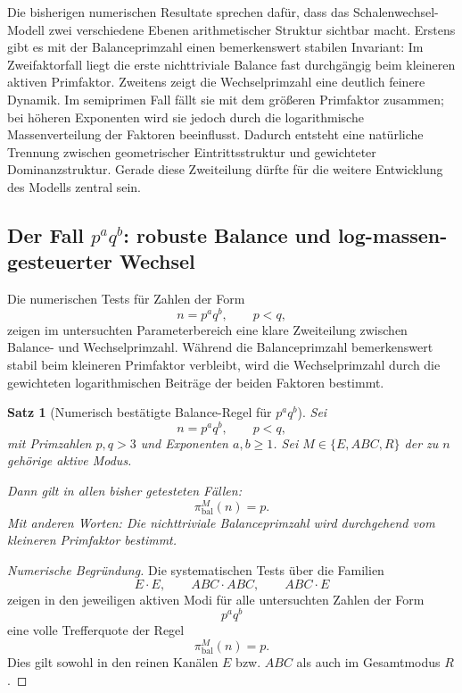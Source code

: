 \documentclass[11pt,a4paper]{article}
\newtheorem{satz}{Satz}
\theoremstyle{definition}
\theoremstyle{remark}
\begin{document}
	Die bisherigen numerischen Resultate sprechen dafür, dass das Schalenwechsel-Modell
	zwei verschiedene Ebenen arithmetischer Struktur sichtbar macht. Erstens gibt es
	mit der Balanceprimzahl einen bemerkenswert stabilen Invariant: Im Zweifaktorfall
	liegt die erste nichttriviale Balance fast durchgängig beim kleineren aktiven
	Primfaktor. Zweitens zeigt die Wechselprimzahl eine deutlich feinere Dynamik.
	Im semiprimen Fall fällt sie mit dem größeren Primfaktor zusammen; bei höheren
	Exponenten wird sie jedoch durch die logarithmische Massenverteilung der Faktoren
	beeinflusst. Dadurch entsteht eine natürliche Trennung zwischen geometrischer
	Eintrittsstruktur und gewichteter Dominanzstruktur. Gerade diese Zweiteilung
	dürfte für die weitere Entwicklung des Modells zentral sein.
	
	\subsection{Der Fall \(p^a q^b\): robuste Balance und log-massen-gesteuerter Wechsel}
	
	Die numerischen Tests für Zahlen der Form
	\[
	n=p^a q^b,\qquad p<q,
	\]
	zeigen im untersuchten Parameterbereich eine klare Zweiteilung zwischen Balance- und
	Wechselprimzahl. Während die Balanceprimzahl bemerkenswert stabil beim kleineren
	Primfaktor verbleibt, wird die Wechselprimzahl durch die gewichteten logarithmischen
	Beiträge der beiden Faktoren bestimmt.
	
	\begin{satz}[Numerisch bestätigte Balance-Regel für \(p^a q^b\)]
		\label{satz:paqb_balance}
		Sei
		\[
		n=p^a q^b,\qquad p<q,
		\]
		mit Primzahlen \(p,q>3\) und Exponenten \(a,b\ge 1\). Sei \(M\in\{E,ABC,R\}\) der
		zu \(n\) gehörige aktive Modus.
		
		Dann gilt in allen bisher getesteten Fällen:
		\[
		\pi_{\mathrm{bal}}^{M}(n)=p.
		\]
		Mit anderen Worten: Die nichttriviale Balanceprimzahl wird durchgehend vom kleineren
		Primfaktor bestimmt.
	\end{satz}
	
	\begin{proof}[Numerische Begründung]
		Die systematischen Tests über die Familien
		\[
		E\cdot E,\qquad ABC\cdot ABC,\qquad ABC\cdot E
		\]
		zeigen in den jeweiligen aktiven Modi für alle untersuchten Zahlen der Form
		\[
		p^a q^b
		\]
		eine volle Trefferquote der Regel
		\[
		\pi_{\mathrm{bal}}^{M}(n)=p.
		\]
		Dies gilt sowohl in den reinen Kanälen \(E\) bzw. \(ABC\) als auch im Gesamtmodus \(R\).
	\end{proof}
	
\end{document}
